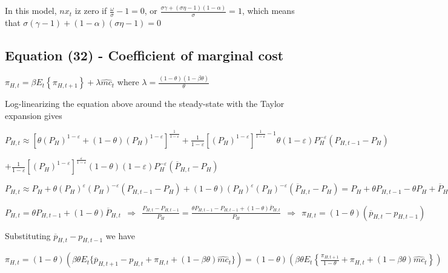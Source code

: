 \documentclass[
]{article}
\begin{document}
In this model, \(nx_t\) iz zero if
\(\displaystyle \frac{\omega}{\sigma} - 1=0\), or
\(\displaystyle \frac{\sigma \gamma + (\sigma \eta - 1)(1-\alpha)}{\sigma}=1\),
which means that \(\sigma (\gamma-1) + (1-\alpha)(\sigma \eta - 1)=0\)

\vspace{12pt}

\hypertarget{equation-32---coefficient-of-marginal-cost}{%
\subsection{Equation (32) - Coefficient of marginal
cost}\label{equation-32---coefficient-of-marginal-cost}}

\(\pi_{H,t} = \beta E_t \left\{ \pi_{H,t+1}\right\}+ \lambda\widehat{mc}_t\)
where
\(\displaystyle \lambda = \frac{(1-\theta) (1-\beta \theta)}{\theta}\)

\vspace{8pt}

Log-linearizing the equation above around the steady-state with the
Taylor expansion gives

\(\displaystyle P_{H,t} \approx [\theta(P_H)^{1-\varepsilon} + (1-\theta)(P_H)^{1-\varepsilon}]^{\frac{1}{1-\varepsilon}} + \frac{1}{1-\varepsilon} \left[ (P_H)^{1-\varepsilon} \right]^{\frac{1}{1-\varepsilon}-1} \theta(1-\varepsilon) P_H^{-\varepsilon} (P_{H,t-1}-P_H)\)

\(\displaystyle + \frac{1}{1-\varepsilon} \left[ (P_H)^{1-\varepsilon} \right]^{\frac{\varepsilon}{1-\varepsilon}} (1-\theta)(1-\varepsilon) P_H^{-\varepsilon} (\overline{P}_{H,t}-P_H)\)

\(\displaystyle P_{H,t} \approx P_H + \theta(P_H)^{\varepsilon}(P_H)^{-\varepsilon} (P_{H,t-1}-P_H) + (1-\theta)(P_H)^{\varepsilon}(P_H)^{-\varepsilon} (\overline{P}_{H,t}-P_H)=P_H+\theta P_{H,t-1} -\theta P_H +\overline{P}_{H,t}-P_H - \theta \overline{P}_{H,t} + \theta P_H\)

\(\displaystyle P_{H,t} = \theta P_{H,t-1} + (1-\theta) \overline{P}_{H,t} \ \ \Rightarrow \ \ \frac{P_{H,t}-P_{H,t-1}}{P_H} = \frac{\theta P_{H,t-1} - P_{H,t-1} + (1-\theta) \overline{P}_{H,t}}{P_H} \ \ \Rightarrow \ \ \pi_{H,t}=(1-\theta)(\overline{p}_{H,t}-p_{H,t-1})\)

Substituting \(\overline{p}_{H,t}-p_{H,t-1}\) we have

\(\displaystyle \pi_{H,t}=(1-\theta)(\beta \theta E_t \{ \overline{p}_{H,t+1}-p_{H,t} + \pi_{H,t}+(1-\beta \theta)\widehat{mc}_t\}) = (1-\theta) \left(\beta \theta E_t \left\{ \frac{\pi_{H,t+1}}{1-\theta} + \pi_{H,t}+(1-\beta \theta)\widehat{mc}_t \right\} \right)\)
\end{document}
